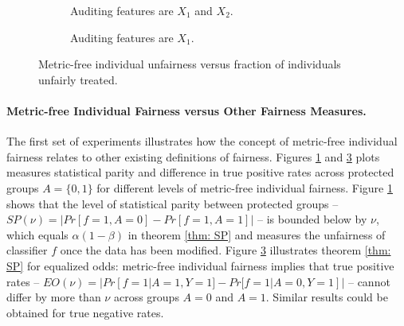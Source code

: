 \documentclass{article}
\begin{document}
\begin{figure}
\begin{subfigure} {.55\linewidth}
\caption{Auditing features are $X_{1}$ and $X_{2}$.}
\label{fig: 1a}
\end{subfigure}
\begin{subfigure} {.55\linewidth}
\caption{Auditing features are $X_{1}$.}
\label{fig: 1b}
\end{subfigure}
\caption{Metric-free individual unfairness versus fraction of individuals unfairly treated.}
\end{figure}

\paragraph{Metric-free Individual Fairness versus Other Fairness Measures.}
The first set of experiments illustrates how the concept of metric-free individual fairness relates to other existing definitions of fairness. Figures \ref{fig: 1a} and \ref{fig: 1b} plots measures statistical parity and  difference in true positive rates across protected groups $A=\{0, 1\}$ for different levels of metric-free individual fairness. Figure \ref{fig: 1a} shows that the level of statistical parity between protected groups -- $SP(\nu)=|Pr[f=1, A=0] - Pr[f=1, A=1]|$ -- is bounded below by $\nu$, which equals $\alpha(1-\beta)$ in theorem \ref{thm: SP} and measures the unfairness of classifier $f$ once the data has been modified. Figure \ref{fig: 1b} illustrates theorem \ref{thm: SP} for equalized odds: metric-free individual fairness implies that true positive rates -- $EO(\nu)= |Pr[f=1|A=1, Y=1] - Pr[f=1|A=0, Y=1]|$ -- cannot differ by more than $\nu$ across groups $A=0$ and $A=1$. Similar results could be obtained for true negative rates.
\end{document}
